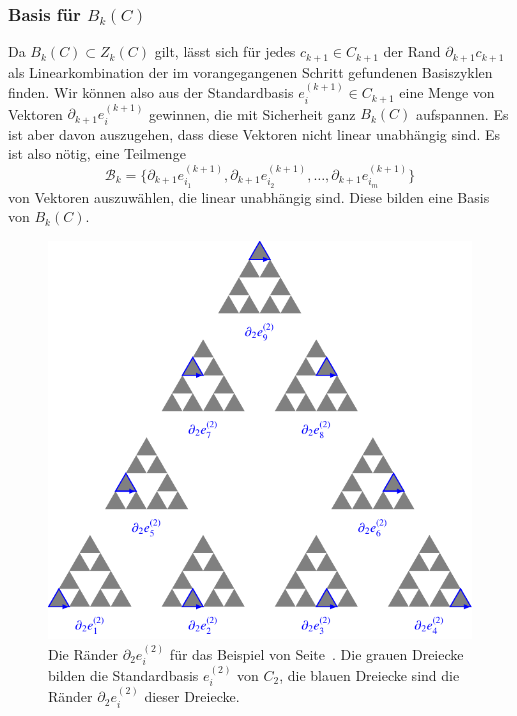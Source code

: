 
\subsubsection{Basis für $B_k(C)$}
Da $B_k(C)\subset Z_k(C)$ gilt, lässt sich für jedes $c_{k+1}\in C_{k+1}$
der Rand $\partial_{k+1}c_{k+1}$ als Linearkombination der im 
vorangegangenen Schritt gefundenen Basiszyklen finden.
Wir können also aus der Standardbasis $e^{(k+1)}_i\in C_{k+1}$ eine Menge
von Vektoren $\partial_{k+1}e^{(k+1)}_i$ gewinnen, die mit Sicherheit
ganz $B_k(C)$ aufspannen.
Es ist aber davon auszugehen, dass diese Vektoren nicht linear unabhängig
sind.
Es ist also nötig, eine Teilmenge
\[
\mathcal{B}_k
=
\{
\partial_{k+1}e^{(k+1)}_{i_1},
\partial_{k+1}e^{(k+1)}_{i_2},
\dots,
\partial_{k+1}e^{(k+1)}_{i_m}
\}
\]
von Vektoren auszuwählen, die linear
unabhängig sind.
Diese bilden eine Basis von $B_k(C)$.

\begin{figure}
\centering
\includegraphics{chapters/95-homologie/images/homoboundaries.pdf}
\caption{Die Ränder $\partial_2e_i^{(2)}$ für das Beispiel von
Seite~\pageref{buch:homologie:beispiel:gausshomo}.
Die grauen Dreiecke bilden die Standardbasis $e_i^{(2)}$ von $C_2$,
die blauen Dreiecke sind die Ränder $\partial_2e_i^{(2)}$ dieser
Dreiecke.
\label{buch:homologie:fig:homoboundaries}}
\end{figure}

